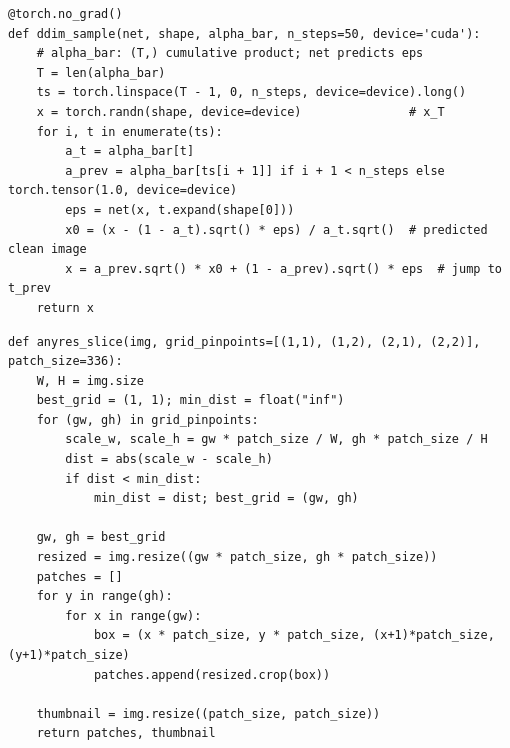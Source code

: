 \begin{lstlisting}
@torch.no_grad()
def ddim_sample(net, shape, alpha_bar, n_steps=50, device='cuda'):
    # alpha_bar: (T,) cumulative product; net predicts eps
    T = len(alpha_bar)
    ts = torch.linspace(T - 1, 0, n_steps, device=device).long()
    x = torch.randn(shape, device=device)               # x_T
    for i, t in enumerate(ts):
        a_t = alpha_bar[t]
        a_prev = alpha_bar[ts[i + 1]] if i + 1 < n_steps else torch.tensor(1.0, device=device)
        eps = net(x, t.expand(shape[0]))
        x0 = (x - (1 - a_t).sqrt() * eps) / a_t.sqrt()  # predicted clean image
        x = a_prev.sqrt() * x0 + (1 - a_prev).sqrt() * eps  # jump to t_prev
    return x
\end{lstlisting}

\begin{lstlisting}
def anyres_slice(img, grid_pinpoints=[(1,1), (1,2), (2,1), (2,2)], patch_size=336):
    W, H = img.size
    best_grid = (1, 1); min_dist = float("inf")
    for (gw, gh) in grid_pinpoints:
        scale_w, scale_h = gw * patch_size / W, gh * patch_size / H
        dist = abs(scale_w - scale_h)
        if dist < min_dist:
            min_dist = dist; best_grid = (gw, gh)
            
    gw, gh = best_grid
    resized = img.resize((gw * patch_size, gh * patch_size))
    patches = []
    for y in range(gh):
        for x in range(gw):
            box = (x * patch_size, y * patch_size, (x+1)*patch_size, (y+1)*patch_size)
            patches.append(resized.crop(box))
            
    thumbnail = img.resize((patch_size, patch_size))
    return patches, thumbnail
\end{lstlisting}

